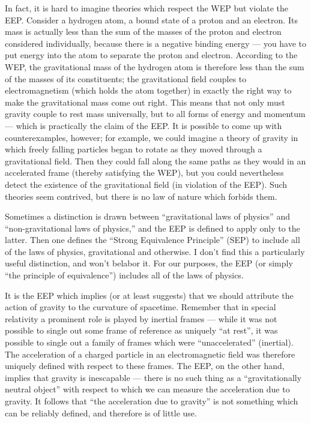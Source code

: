 \documentclass[12pt]{article}
\begin{document}
In fact, it is hard to imagine theories which respect the WEP but
violate the EEP.  Consider a hydrogen atom, a bound state of a proton
and an electron.  Its mass is actually less than the sum of the masses
of the proton and electron considered individually, because there is
a negative binding energy --- you have to put energy into the atom
to separate the proton and electron.  According to the WEP, the 
gravitational mass of the hydrogen atom is therefore less than the
sum of the masses of its constituents; the gravitational field couples
to electromagnetism (which holds the atom together) in exactly the
right way to make the gravitational mass come out right.  This means
that not only must gravity couple to rest mass universally, but to
all forms of energy and momentum --- which is practically the claim of 
the EEP.  It is possible to come up with counterexamples, however; for
example, we could imagine a theory of gravity in which freely falling 
particles began to rotate as they moved through a gravitational field.  
Then they could fall along the same paths as they would in an accelerated 
frame (thereby satisfying the WEP), but you could nevertheless detect the
existence of the gravitational field (in violation of the EEP).
Such theories seem contrived, but there is no law of nature which
forbids them.

Sometimes a distinction is drawn between ``gravitational laws of
physics'' and ``non-gravitational laws of physics,'' and the EEP
is defined to apply only to the latter.  Then one defines the
``Strong Equivalence Principle'' (SEP) to include all of the laws of
physics, gravitational and otherwise.  I don't find this a particularly
useful distinction, and won't belabor it.  For our purposes, the
EEP (or simply ``the principle of equivalence'') includes all of the
laws of physics.

It is the EEP which implies (or at least suggests) that we should
attribute the action of gravity to the curvature of spacetime.  
Remember that in special relativity a prominent role is played by
inertial frames --- while it was not possible to single out some
frame of reference as uniquely ``at rest'', it was possible to single
out a family of frames which were ``unaccelerated'' (inertial).
The acceleration of a charged particle in an electromagnetic field
was therefore uniquely defined with respect to these frames.  The
EEP, on the other hand, implies that gravity is inescapable --- there
is no such thing as a ``gravitationally neutral object'' with respect 
to which we can measure the acceleration due to gravity.  It follows
that ``the acceleration due to gravity'' is not something which can
be reliably defined, and therefore is of little use.  
\end{document}
